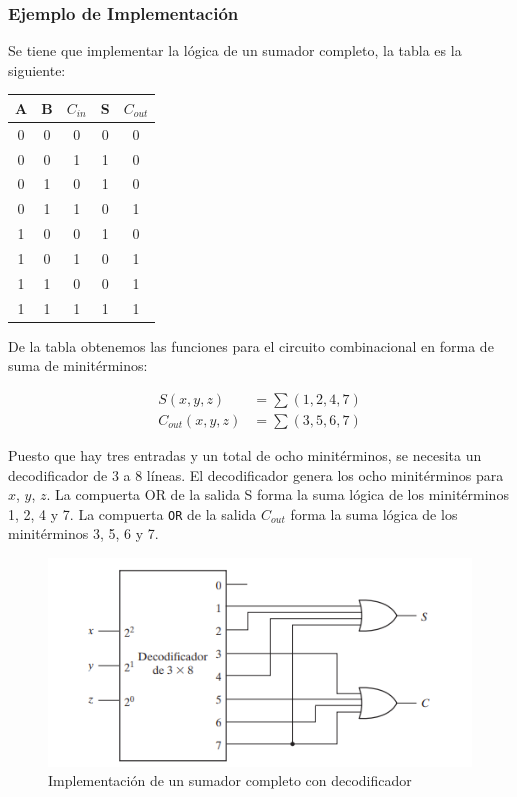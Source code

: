 \subsubsection{Ejemplo de Implementación}
Se tiene que implementar la lógica de un sumador completo, la tabla es la siguiente:
\begin{table}[h]
    \centering
    \begin{tabular}{ccc|cc}
        \toprule
        \textbf{A} & \textbf{B} & \textbf{$C_{in}$} & \textbf{S} & \textbf{$C_{out}$}\\
        \midrule
        0 & 0 & 0 & 0 & 0\\
        0 & 0 & 1 & 1 & 0\\
        0 & 1 & 0 & 1 & 0\\
        0 & 1 & 1 & 0 & 1\\
        1 & 0 & 0 & 1 & 0\\
        1 & 0 & 1 & 0 & 1\\
        1 & 1 & 0 & 0 & 1\\
        1 & 1 & 1 & 1 & 1\\
        \bottomrule
    \end{tabular}
\end{table}

De la tabla obtenemos las funciones para el circuito combinacional en forma de suma de minitérminos:

\begin{align*}
    S(x,y,z) &= \sum (1, 2, 4, 7) \\
    C_{out}(x,y,z) &= \sum (3, 5, 6, 7) 
\end{align*}

Puesto que hay tres entradas y un total de ocho minitérminos, se necesita un decodificador de 3 a 8 líneas. El decodificador genera los ocho minitérminos para $x$, $y$, $z$. La compuerta OR de la salida S forma la suma lógica de los minitérminos 1, 2, 4 y 7. La compuerta \texttt{OR} de la salida $C_{out}$ forma la suma lógica de los minitérminos 3, 5, 6 y 7.

\begin{figure}[h]
\centering
\includegraphics[scale=0.8]{img/sumador.png}
\caption{Implementación de un sumador completo con decodificador}
\end{figure}